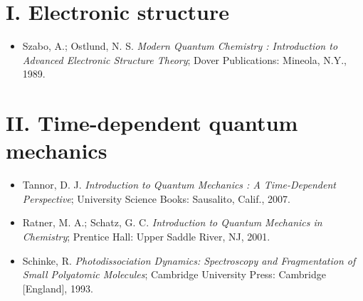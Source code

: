 \section*{I. Electronic structure}
\begin{itemize}

\item Szabo, A.; Ostlund, N. S. \textit{Modern Quantum Chemistry : Introduction to Advanced Electronic Structure Theory}; Dover Publications: Mineola, N.Y., 1989.

\end{itemize}

\section*{II. Time-dependent quantum mechanics}
\begin{itemize}

\item Tannor, D. J. \textit{Introduction to Quantum Mechanics : A Time-Dependent Perspective}; University Science Books: Sausalito, Calif., 2007.

\item Ratner, M. A.; Schatz, G. C. \textit{Introduction to Quantum Mechanics in Chemistry}; Prentice Hall: Upper Saddle River, NJ, 2001.

\item Schinke, R. \textit{Photodissociation Dynamics: Spectroscopy and Fragmentation of Small Polyatomic Molecules}; Cambridge University Press: Cambridge [England], 1993.

\end{itemize}



